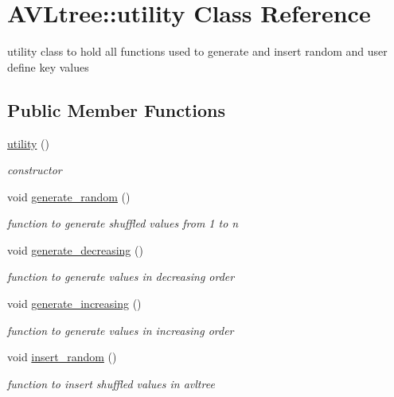 \hypertarget{class_a_v_ltree_1_1utility}{\section{A\-V\-Ltree\-:\-:utility Class Reference}
\label{class_a_v_ltree_1_1utility}
}


utility class to hold all functions used to generate and insert random and user define key values  


\subsection*{Public Member Functions}
\begin{DoxyCompactItemize}
\item 
\hyperlink{class_a_v_ltree_1_1utility_a63162c12448b1c0d8b351c4ec5f02ef5}{utility} ()
\begin{DoxyCompactList}\small\item\em constructor \end{DoxyCompactList}\item 
void \hyperlink{class_a_v_ltree_1_1utility_a9163a8916c3293016f1143e8d4d4ade9}{generate\-\_\-random} ()
\begin{DoxyCompactList}\small\item\em function to generate shuffled values from 1 to n \end{DoxyCompactList}\item 
void \hyperlink{class_a_v_ltree_1_1utility_abb610a3d64533444f85ee41f0e09bc05}{generate\-\_\-decreasing} ()
\begin{DoxyCompactList}\small\item\em function to generate values in decreasing order \end{DoxyCompactList}\item 
void \hyperlink{class_a_v_ltree_1_1utility_a9207ffd12e890d38fe4d70e6517f56eb}{generate\-\_\-increasing} ()
\begin{DoxyCompactList}\small\item\em function to generate values in increasing order \end{DoxyCompactList}\item 
void \hyperlink{class_a_v_ltree_1_1utility_adadd00e745c738b1c812a4687d46b81d}{insert\-\_\-random} ()
\begin{DoxyCompactList}\small\item\em function to insert shuffled values in avltree \end{DoxyCompactList}\item 

\end{DoxyCompactItemize}
